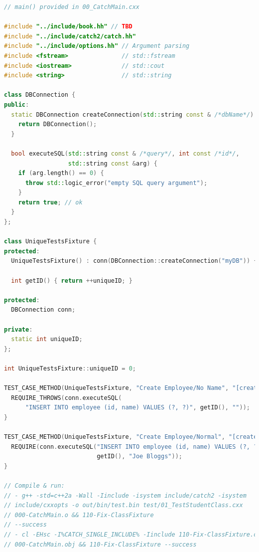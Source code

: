 \documentclass[a4paper, 11pt]{article}
\theoremstyle{definition}
\theoremstyle{plain}
\begin{document}
      \begin{lstlisting}[language=c++,caption={01\_TestBookType.cxx}]
// main() provided in 00_CatchMain.cxx

#include "../include/book.hh" // TBD
#include "../include/catch2/catch.hh"
#include "../include/options.hh" // Argument parsing
#include <fstream>               // std::fstream
#include <iostream>              // std::cout
#include <string>                // std::string

class DBConnection {
public:
  static DBConnection createConnection(std::string const & /*dbName*/) {
    return DBConnection();
  }

  bool executeSQL(std::string const & /*query*/, int const /*id*/,
                  std::string const &arg) {
    if (arg.length() == 0) {
      throw std::logic_error("empty SQL query argument");
    }
    return true; // ok
  }
};

class UniqueTestsFixture {
protected:
  UniqueTestsFixture() : conn(DBConnection::createConnection("myDB")) {}

  int getID() { return ++uniqueID; }

protected:
  DBConnection conn;

private:
  static int uniqueID;
};

int UniqueTestsFixture::uniqueID = 0;

TEST_CASE_METHOD(UniqueTestsFixture, "Create Employee/No Name", "[create]") {
  REQUIRE_THROWS(conn.executeSQL(
      "INSERT INTO employee (id, name) VALUES (?, ?)", getID(), ""));
}

TEST_CASE_METHOD(UniqueTestsFixture, "Create Employee/Normal", "[create]") {
  REQUIRE(conn.executeSQL("INSERT INTO employee (id, name) VALUES (?, ?)",
                          getID(), "Joe Bloggs"));
}

// Compile & run:
// - g++ -std=c++2a -Wall -Iinclude -isystem include/catch2 -isystem
// include/cxxopts -o out/bin/test.bin test/01_TestStudentClass.cxx
// 000-CatchMain.o && 110-Fix-ClassFixture
// --success
// - cl -EHsc -I%CATCH_SINGLE_INCLUDE% -Iinclude 110-Fix-ClassFixture.cpp
// 000-CatchMain.obj && 110-Fix-ClassFixture --success
      \end{lstlisting}
\end{document}
